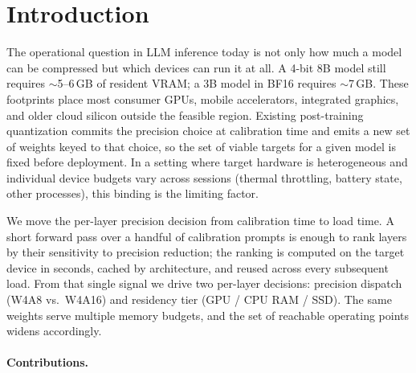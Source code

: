 \documentclass{article}
\begin{document}
\section{Introduction}
\label{sec:intro}

The operational question in LLM inference today is not only how much a
model can be compressed but which devices can run it at all. A 4-bit 8B
model still requires $\sim$5--6\,GB of resident VRAM; a 3B model in BF16
requires $\sim$7\,GB. These footprints place most consumer GPUs, mobile
accelerators, integrated graphics, and older cloud silicon outside the
feasible region. Existing post-training quantization
commits the precision choice at calibration time and emits a new set of
weights keyed to that choice, so the set of viable targets for a given
model is fixed before deployment. In a setting where target hardware is
heterogeneous and individual device budgets vary across sessions
(thermal throttling, battery state, other processes), this binding is
the limiting factor.

We move the per-layer precision decision from calibration time to load
time. A short forward pass over a handful of calibration prompts is
enough to rank layers by their sensitivity to precision reduction; the
ranking is computed on the target device in seconds, cached by
architecture, and reused across every subsequent load. From that single
signal we drive two per-layer decisions: precision dispatch (W4A8
vs.\ W4A16) and residency tier (GPU / CPU RAM / SSD). The same weights
serve multiple memory budgets, and the set of reachable operating
points widens accordingly.

\paragraph{Contributions.}
\end{document}
